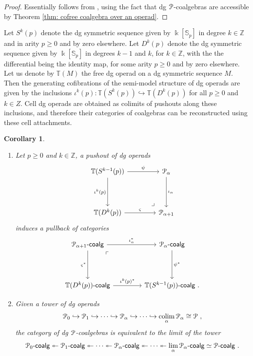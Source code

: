 \documentclass[a4paper,12pt]{amsart}
\renewcommand{\mathcal}{\EuScript}
\DeclareMathOperator*{\colim}{colim}
\newcommand{\oneop}{\mathcal{P}}
\newcommand{\onecoalg}[1]{#1\text{-}\mathsf{coalg}}
\newcommand{\onepcoalg}{\mathcal{P}\text{-}\mathsf{coalg}}
\theoremstyle{plain}
\newtheorem{corollary}[theorem]{Corollary}%
\theoremstyle{definition}
\theoremstyle{remark}
\newcommand{\kk}{\Bbbk}
\begin{document}
\begin{proof}
Essentially follows from \cite[Section B.1.3]{DrummondColeHirshLejay20}, using the fact that dg $\mathcal{P}$-coalgebras are accessible by Theorem \ref{thm: cofree coalgebra over an operad}.
\end{proof}

Let $S^{k}(p)$ denote the dg symmetric sequence given by $\kk[\mathbb{S}_p]$ in degree $k \in \mathbb{Z}$ and in arity $p \geq 0$ and by zero elsewhere. Let $D^k(p)$ denote the dg symmetric sequence given by $\kk[\mathbb{S}_p]$ in degrees $k-1$ and $k$, for $k \in \mathbb{Z}$, with the the differential being the identity map, for some arity $p \geq 0$ and by zero elsewhere. Let us denote by $\mathbb{T}(M)$ the free dg operad on a dg symmetric sequence $M$. Then the generating cofibrations of the semi-model structure of dg operads are given by the inclusions $\iota^k(p): \mathbb{T}(S^{k}(p)) \hookrightarrow \mathbb{T}(D^k(p))$ for all $p \geq 0$ and $k \in Z$. Cell dg operads are obtained as colimits of pushouts along these inclusions, and therefore their categories of coalgebras can be reconstructed using these cell attachments. 

\begin{corollary}\label{corollary: devissage along cells of 1-categories of P-coalgebras}\leavevmode
\begin{enumerate}
\item Let $p \geq 0$ and $k \in \mathbb{Z}$, a pushout of dg operads 
\[
\begin{tikzcd}[column sep=3.5pc,row sep=3.5pc]
\mathbb{T}(S^{k-1}(p)) \arrow[r,"\psi"] \arrow[d,"\iota^k(p)",swap]  \arrow[dr, phantom,"\ulcorner" rotate=-180, very near end]
&\oneop_\alpha \arrow[d,"\iota_\alpha"]  \\
\mathbb{T}(D^k(p)) \arrow[r,"\varsigma"]
&\oneop_{\alpha + 1}
\end{tikzcd}
\]
induces a pullback of categories
\[
\begin{tikzcd}[column sep=3.5pc,row sep=3.5pc]
\onecoalg{\oneop_{\alpha + 1}} \arrow[r,"\iota_\alpha^*"] \arrow[d,"\varsigma^*",swap] \arrow[dr, phantom, "\ulcorner", very near start]
&\onecoalg{\oneop_\alpha} \arrow[d,"\psi^*"]  \\
\onecoalg{\mathbb{T}(D^k(p))} \arrow[r,"\iota^k(p)^*"]
&\onecoalg{\mathbb{T}(S^{k-1}(p))}~.
\end{tikzcd}
\]

\item Given a tower of dg operads
\[
\oneop_0 \hookrightarrow \oneop_1 \hookrightarrow \cdots \hookrightarrow \oneop_\alpha \hookrightarrow \cdots \hookrightarrow \colim_{\alpha} \oneop_\alpha \cong \oneop~, 
\]
the category of dg $\oneop$-coalgebras is equivalent to the limit of the tower 
\[
\onecoalg{\oneop_0} \twoheadleftarrow \onecoalg{\oneop_1} \twoheadleftarrow \cdots \twoheadleftarrow \onecoalg{\oneop_\alpha} \twoheadleftarrow  \cdots \twoheadleftarrow \lim_{\alpha} \onecoalg{\oneop_\alpha} \simeq \onepcoalg~. 
\]
\end{enumerate}
\end{corollary}
\end{document}
